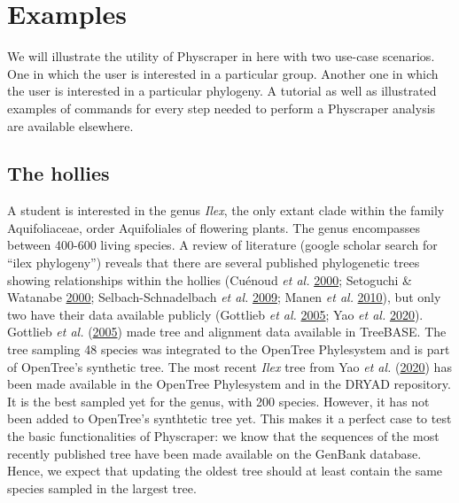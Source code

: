 \documentclass[]{article}
\begin{document}
\hypertarget{examples}{%
\section{Examples}\label{examples}}

We will illustrate the utility of Physcraper in here with two use-case scenarios. One in which the user is interested in a particular group. Another one in which the user is interested in a particular phylogeny.
A tutorial as well as illustrated examples of commands for every step needed to perform a Physcraper analysis are available elsewhere.

\hypertarget{the-hollies}{%
\subsection{The hollies}\label{the-hollies}}

A student is interested in the genus \emph{Ilex}, the only extant clade within the family Aquifoliaceae, order Aquifoliales of flowering plants.
The genus encompasses between 400-600 living species. A review of literature (google scholar search for ``ilex phylogeny'') reveals that there are several published phylogenetic trees showing relationships within the hollies (Cuénoud \emph{et al.} \protect\hyperlink{ref-cuenoud2000molecular}{2000}; Setoguchi \& Watanabe \protect\hyperlink{ref-setoguchi2000intersectional}{2000}; Selbach-Schnadelbach \emph{et al.} \protect\hyperlink{ref-selbach2009new}{2009}; Manen \emph{et al.} \protect\hyperlink{ref-manen2010history}{2010}), but only two have their data available publicly (Gottlieb \emph{et al.} \protect\hyperlink{ref-gottlieb2005molecular}{2005}; Yao \emph{et al.} \protect\hyperlink{ref-yao2020phylogeny}{2020}).
Gottlieb \emph{et al.} (\protect\hyperlink{ref-gottlieb2005molecular}{2005}) made tree and alignment data available in TreeBASE. The tree sampling 48 species was integrated to the OpenTree Phylesystem and is part of OpenTree's synthetic tree.
The most recent \emph{Ilex} tree from Yao \emph{et al.} (\protect\hyperlink{ref-yao2020phylogeny}{2020}) has been made available in the OpenTree Phylesystem and in the DRYAD repository. It is the best sampled yet for the genus, with 200 species. However, it has not been added to OpenTree's synthtetic tree yet.
This makes it a perfect case to test the basic functionalities of Physcraper: we know that the sequences of the most recently published tree have been made available on the GenBank database. Hence, we expect that updating the oldest tree should at least contain the same species sampled in the largest tree.
\end{document}
